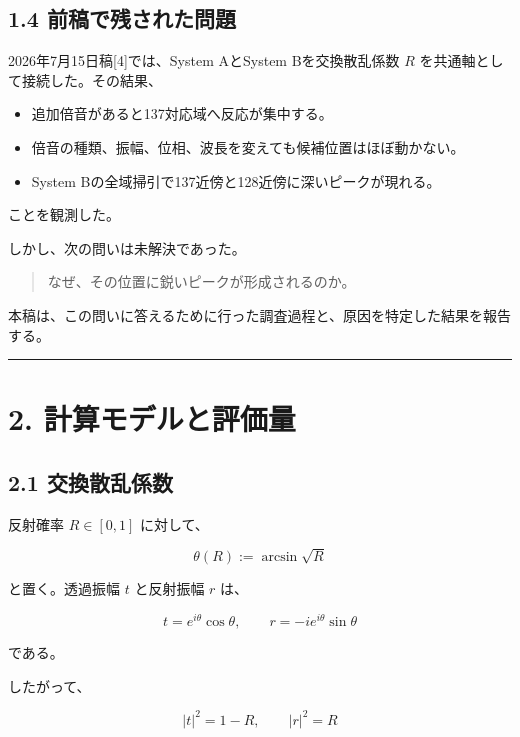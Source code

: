 \documentclass[
  10pt,
  a4paper,
]{article}
\providecommand{\tightlist}{%
  \setlength{\itemsep}{0pt}\setlength{\parskip}{0pt}}
\begin{document}
\subsection{1.4
前稿で残された問題}\label{ux524dux7a3fux3067ux6b8bux3055ux308cux305fux554fux984c}

2026年7月15日稿{[}4{]}では、System AとSystem Bを交換散乱係数 \(R\)
を共通軸として接続した。その結果、

\begin{itemize}
\tightlist
\item
  追加倍音があると137対応域へ反応が集中する。
\item
  倍音の種類、振幅、位相、波長を変えても候補位置はほぼ動かない。
\item
  System Bの全域掃引で137近傍と128近傍に深いピークが現れる。
\end{itemize}

ことを観測した。

しかし、次の問いは未解決であった。

\begin{quote}
なぜ、その位置に鋭いピークが形成されるのか。
\end{quote}

本稿は、この問いに答えるために行った調査過程と、原因を特定した結果を報告する。

\begin{center}\rule{0.5\linewidth}{0.5pt}\end{center}

\section{2.
計算モデルと評価量}\label{ux8a08ux7b97ux30e2ux30c7ux30ebux3068ux8a55ux4fa1ux91cf}

\subsection{2.1
交換散乱係数}\label{ux4ea4ux63dbux6563ux4e71ux4fc2ux6570}

反射確率 \(R\in[0,1]\) に対して、

\[
\theta(R):=\arcsin\sqrt R
\]

と置く。透過振幅 \(t\) と反射振幅 \(r\) は、

\[
t=e^{i\theta}\cos\theta,
\qquad
r=-ie^{i\theta}\sin\theta
\]

である。

したがって、

\[
|t|^2=1-R,
\qquad
|r|^2=R
\]
\end{document}

